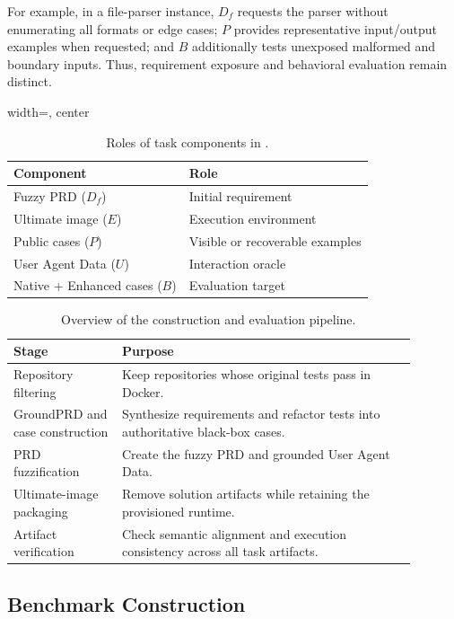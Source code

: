 For example, in a file-parser instance, $D_f$ requests the parser without enumerating all formats or edge cases; $P$ provides representative input/output examples when requested; and $B$ additionally tests unexposed malformed and boundary inputs. Thus, requirement exposure and behavioral evaluation remain distinct.

\begin{table}[htbp]
\centering
\caption{Roles of task components in \rcb{}.}
\label{tab:component-roles}
\small
\begin{adjustbox}{width=\linewidth, center}
\begin{tabular}{ll}
\toprule
Component & Role \\
\midrule
Fuzzy PRD ($D_f$) & Initial requirement \\
Ultimate image ($E$) & Execution environment \\
Public cases ($P$) & Visible or recoverable examples \\
User Agent Data ($U$) & Interaction oracle \\
Native + Enhanced cases ($B$) & Evaluation target \\
\bottomrule
\end{tabular}
\end{adjustbox}
\end{table}

\begin{table}[t]
\centering
\caption{Overview of the \rcb{} construction and evaluation pipeline.}
\label{tab:pipeline}
\small
\begin{tabular}{p{0.24\linewidth}p{0.65\linewidth}}
\toprule
Stage & Purpose \\
\midrule
Repository filtering & Keep repositories whose original tests pass in Docker. \\
GroundPRD and case construction & Synthesize requirements and refactor tests into authoritative black-box cases. \\
PRD fuzzification & Create the fuzzy PRD and grounded User Agent Data. \\
Ultimate-image packaging & Remove solution artifacts while retaining the provisioned runtime. \\
Artifact verification & Check semantic alignment and execution consistency across all task artifacts. \\
\bottomrule
\end{tabular}
\end{table}

\subsection{Benchmark Construction}
\label{sec:construction}

